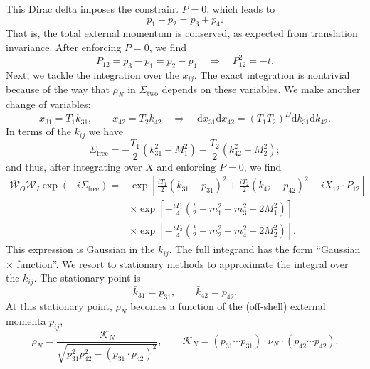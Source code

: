 This Dirac delta imposes the constraint $P = 0$, which leads to
\begin{equation}
	p_{1} + p_{2} = p_{3} + p_{4}.
\end{equation}
That is, the total external momentum is conserved, as expected from translation invariance. After enforcing $P = 0$, we find
\begin{equation}
	P_{1 2} = p_{3} - p_{1} = p_{2} - p_{4} \quad \Longrightarrow \quad P_{1 2}^{2} = -t.
\end{equation}
Next, we tackle the integration over the $x_{ij}$. The exact integration is nontrivial because of the way that $\rho_{N}$ in $\Sigma_{\text{two}}$ depends on these variables. We make another change of variables:
\begin{equation}
	x_{31} = T_{1} k_{31}, \qquad x_{42} = T_{2} k_{42} \quad \Longrightarrow \quad \mathrm{d}x_{31} \mathrm{d}x_{42} = (T_{1} T_{2})^{D} \mathrm{d}k_{31} \mathrm{d}k_{42}.
\end{equation}
In terms of the $k_{ij}$ we have
\begin{equation}
	\Sigma_{\text{free}} = -\frac{T_{1}}{2} \left(k_{31}^{2} - M_{1}^{2} \right) - \frac{T_{2}}{2} \left( k_{42}^{2} - M_{2}^{2} \right);
\end{equation}
and thus, after integrating over $X$ and enforcing $P = 0$, we find
\begin{equation}
\begin{split}
	\overline{\mathcal{W}}_{O} \mathcal{W}_{I} \exp{(-i \Sigma_{\text{free}})} = {}& \exp{\left[ \frac{i T_{1}}{2} (k_{31} - p_{31})^{2} + \frac{i T_{2}}{2} (k_{42} - p_{42})^{2} - i X_{12} \cdot P_{12} \right]} \\
	&\times \exp{\left[ -\frac{i T_{1}}{4} \left( \frac{t}{2} -m_{1}^{2} - m_{3}^{2} + 2 M_{1}^{2} \right) \right]} \\
	&\times \exp{\left[ -\frac{i T_{2}}{4} \left( \frac{t}{2} -m_{2}^{2} - m_{4}^{2} + 2 M_{2}^{2} \right) \right]}.
\end{split}
\end{equation}
This expression is Gaussian in the $k_{ij}$. The full integrand has the form ``Gaussian $\times$ function''. We resort to stationary methods to approximate the integral over the $k_{ij}$. The stationary point is
\begin{equation}
	\bar{k}_{31} = p_{31}, \qquad \bar{k}_{42} = p_{42}.
\end{equation}
At this stationary point, $\rho_{N}$ becomes a function of the (off-shell) external momenta $p_{ij}$,
\begin{equation}
	\rho_{N} = \frac{\mathcal{K}_{N}}{\sqrt{p_{31}^{2} p_{42}^{2} - (p_{31} \cdot p_{42})^{2}}}, \qquad \mathcal{K}_{N} = \left(p_{3 1} \cdots p_{3 1} \right) \cdot \nu_{N} \cdot \left(p_{4 2} \cdots p_{4 2}\right).
\end{equation}

